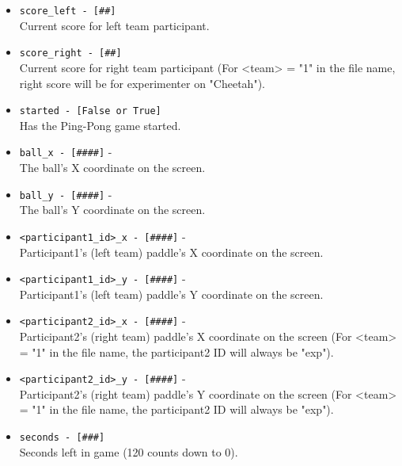 \begin{description}
\begin{addmargin}[0em]{0em}
\begin{addmargin}[1em]{0em}
\begin{itemize}
                \item \verb|score_left - [##]|\\ Current score for left team participant.
                \item \verb|score_right - [##]|\\ Current score for right team participant (For <team> = "1" in the file name, right score will be for experimenter on "Cheetah").
                \item \verb|started - [False or True]|\\Has the Ping-Pong game started.
                \item \verb|ball_x - [####]| - \\The ball's X coordinate on the screen.
                \item \verb|ball_y - [####]| - \\The ball's Y coordinate on the screen.
                \item \verb|<participant1_id>_x - [####]| -\\Participant1's (left team) paddle's X coordinate on the screen.
                \item \verb|<participant1_id>_y - [####]| -\\Participant1's (left team) paddle's Y coordinate on the screen.
                \item \verb|<participant2_id>_x - [####]| -\\Participant2's (right team) paddle's X coordinate on the screen (For <team> = "1" in the file name, the participant2 ID will always be "exp").
                \item \verb|<participant2_id>_y - [####]| -\\Participant2's (right team) paddle's Y coordinate on the screen (For <team> = "1" in the file name, the participant2 ID will always be "exp").
                \item \verb|seconds - [###]|\\Seconds left in game (120 counts down to 0).
            \end{itemize}
        \end{addmargin} %



\end{addmargin}
\end{description}
